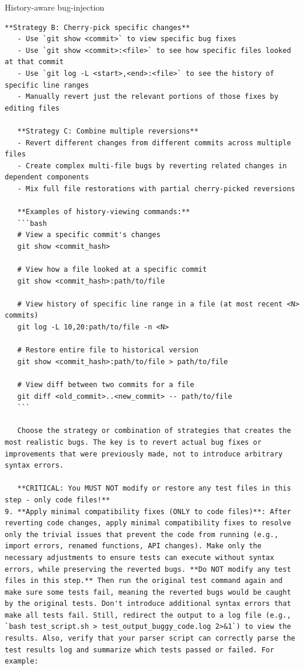 \begin{promptbox}{History-aware bug-injection}
\begin{Verbatim}[breaklines=true]
   **Strategy B: Cherry-pick specific changes**
   - Use `git show <commit>` to view specific bug fixes
   - Use `git show <commit>:<file>` to see how specific files looked at that commit
   - Use `git log -L <start>,<end>:<file>` to see the history of specific line ranges
   - Manually revert just the relevant portions of those fixes by editing files

   **Strategy C: Combine multiple reversions**
   - Revert different changes from different commits across multiple files
   - Create complex multi-file bugs by reverting related changes in dependent components
   - Mix full file restorations with partial cherry-picked reversions

   **Examples of history-viewing commands:**
   ```bash
   # View a specific commit's changes
   git show <commit_hash>

   # View how a file looked at a specific commit
   git show <commit_hash>:path/to/file

   # View history of specific line range in a file (at most recent <N> commits)
   git log -L 10,20:path/to/file -n <N>

   # Restore entire file to historical version
   git show <commit_hash>:path/to/file > path/to/file

   # View diff between two commits for a file
   git diff <old_commit>..<new_commit> -- path/to/file
   ```

   Choose the strategy or combination of strategies that creates the most realistic bugs. The key is to revert actual bug fixes or improvements that were previously made, not to introduce arbitrary syntax errors.

   **CRITICAL: You MUST NOT modify or restore any test files in this step - only code files!**
9. **Apply minimal compatibility fixes (ONLY to code files)**: After reverting code changes, apply minimal compatibility fixes to resolve only the trivial issues that prevent the code from running (e.g., import errors, renamed functions, API changes). Make only the necessary adjustments to ensure tests can execute without syntax errors, while preserving the reverted bugs. **Do NOT modify any test files in this step.** Then run the original test command again and make sure some tests fail, meaning the reverted bugs would be caught by the original tests. Don't introduce additional syntax errors that make all tests fail. Still, redirect the output to a log file (e.g., `bash test_script.sh > test_output_buggy_code.log 2>&1`) to view the results. Also, verify that your parser script can correctly parse the test results log and summarize which tests passed or failed. For example:


\end{Verbatim}
\end{promptbox}
